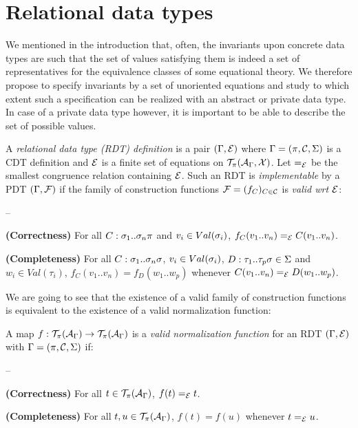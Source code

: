 
\section{Relational data types}
\label{sec-rdt}

We mentioned in the introduction that, often, the invariants upon
concrete data types are such that the set of values satisfying them is
indeed a set of representatives for the equivalence classes of some
equational theory. We therefore propose to specify invariants by a set
of unoriented equations and study to which extent such a specification
can be realized with an abstract or private data type. In case of a
private data type however, it is important to be able to describe the
set of possible values.

\begin{dfn}
A {\em relational data type (RDT) definition} is a pair $(\Gamma,\mathcal{E})$
where $\Gamma=(\pi,\mathcal{C},\Sigma)$ is a CDT definition and $\mathcal{E}$ is a finite set
of equations on $\mathcal{T}_\pi(\mathcal{A}_\Gamma,\mathcal{X})$. Let $=_\mathcal{E}$ be the smallest
congruence relation containing $\mathcal{E}$. Such an RDT is {\em
implementable} by a PDT $(\Gamma,\mathcal{F})$ if the family of construction
functions $\mathcal{F}=(f_C)_{C\in\mathcal{C}}$ is {\em valid wrt $\mathcal{E}$}:

\begin{lst}{--}
\item [\bf(Correctness)]
For all $C:\sigma_1..\sigma_n\pi$ and $v_i\in Val(\sigma_i)$,
$f_C(v_1..v_n)=_\mathcal{E} C(v_1..v_n)$.
\item [\bf(Completeness)]
For all $C:\sigma_1..\sigma_n\sigma$, $v_i\in Val(\sigma_i)$,
$D:\tau_1..\tau_p\sigma\in\Sigma$ and $w_i\in Val(\tau_i)$, $f_C(v_1..v_n)=
f_D(w_1..w_p)$ whenever $C(v_1..v_n)=_\mathcal{E} D(w_1..w_p)$.
\end{lst}
\end{dfn}


We are going to see that the existence of a valid family of
construction functions is equivalent to the existence of a valid
normalization function:

\begin{dfn}
A map $f:\mathcal{T}_\pi(\mathcal{A}_\Gamma)\rightarrow\mathcal{T}_\pi(\mathcal{A}_\Gamma)$ is a {\em valid
normalization function} for an RDT $(\Gamma,\mathcal{E})$ with $\Gamma=(\pi,\mathcal{C},\Sigma)$
if:

\begin{lst}{--}
\item [\bf(Correctness)]
For all $t\in\mathcal{T}_\pi(\mathcal{A}_\Gamma)$, $f(t)=_\mathcal{E} t$.
\item [\bf(Completeness)]
For all $t,u\in\mathcal{T}_\pi(\mathcal{A}_\Gamma)$, $f(t)= f(u)$ whenever $t=_\mathcal{E} u$.
\end{lst}
\end{dfn}

